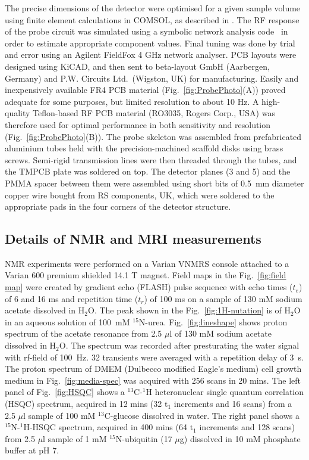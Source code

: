\documentclass[preprint,5p]{elsarticle}
\newcommand{\fig}[1]{Fig.~\ref{#1}}
\begin{document}
The precise dimensions of the detector were optimised for a given sample volume
using finite element calculations in COMSOL, as described in \cite{gream_2016}.
The RF response of the probe circuit was simulated using a symbolic network
analysis code~\cite{gream-thesis} in order to estimate appropriate component
values. Final tuning was done by trial and error using an Agilent FieldFox 4 GHz
network analyser. PCB layouts were designed using KiCAD, and then sent to
beta-layout GmbH (Aarbergen, Germany) and P.W. Circuits Ltd.~(Wigston, UK) for
manufacturing. Easily and inexpensively available FR4 PCB material
(\fig{fig:ProbePhoto}(A)) proved adequate for some purposes, but limited
resolution to about 10 Hz. A high-quality Teflon-based RF PCB material (RO3035,
Rogers Corp., USA) was therefore used for optimal performance in both
sensitivity and resolution (\fig{fig:ProbePhoto}(B)). The probe skeleton was
assembled from prefabricated aluminium tubes held with the precision-machined
scaffold disks using brass screws. Semi-rigid transmission lines were then
threaded through the tubes, and the TMPCB plate was soldered on top. The
detector planes (3 and 5) and the PMMA spacer between them were assembled using
short bits of 0.5~mm \cbstart diameter copper wire bought from RS components, UK, \cbend which were soldered to the appropriate pads in the four corners of the detector structure.

\cbstart
\subsection{Details of NMR and MRI measurements}
NMR experiments were performed on a Varian VNMRS console attached to a Varian 600 premium shielded 14.1 T magnet. Field maps in the \fig{fig:field map} were created by gradient echo (FLASH) pulse sequence with echo times ($t_{e}$) of 6 and 16 ms and repetition time ($t_{r}$) of 100 ms on a sample of 130 mM  sodium acetate dissolved in H$_2$O. The peak shown in the \fig{fig:1H-nutation} is of H$_2$O in an aqueous solution of 100~mM $^{15}$N-urea. \fig{fig:lineshape} shows proton spectrum of the acetate resonance from 2.5 $\mu$l of 130 mM  sodium acetate dissolved in H$_2$O. The spectrum was recorded after presturating the water signal with rf-field of 100~Hz. 32 transients were averaged with a repetition delay of 3~s. The proton spectrum of DMEM (Dulbecco
modified Eagle's medium) cell growth medium in \fig{fig:media-spec} was acquired with 256 scans in 20 mins.
The left panel of \fig{fig:HSQC} shows a $^{13}$C-$^{1}$H heteronuclear single
quantum correlation (HSQC) spectrum, acquired in 12 mins (32 t$_1$ increments
and 16 scans) from a 2.5 $\mu$l sample of 100 mM $^{13}$C-glucose dissolved in
water. The right panel shows a $^{15}$N-$^{1}$H-HSQC spectrum, acquired in 400
mins (64 t$_1$ increments and 128 scans) from 2.5 $\mu$l sample of 1 mM
$^{15}$N-ubiquitin (17 $\mu$g) dissolved in 10 mM phosphate buffer at pH 7.
\end{document}
